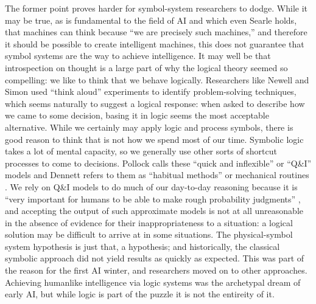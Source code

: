 The former point proves harder for symbol-system researchers to dodge.
While it may be true, as is 
fundamental to the field of AI and which even Searle holds, that
machines can think because ``we are precisely such machines,'' \cite[p.
83]{chineseSearle} and therefore it should be possible to create
intelligent machines, this does not guarantee that symbol systems are
the way to achieve intelligence. It may well be that introspection on
thought is a large part of why the logical theory seemed so
compelling:  we like to think that we behave logically. Researchers like Newell
and Simon used ``think aloud'' experiments to identify problem-solving
techniques, \cite[Ch. 10]{mccorduck} which seems naturally to suggest a
logical response:  when
asked to describe how we came to some decision, basing it in logic
seems the most acceptable alternative. While we certainly may apply logic
and process symbols, there is good reason to think that is not how we
spend most of our time. Symbolic logic takes a lot of mental capacity,
so we generally use other sorts of shortcut processes to come to
decisions. Pollock calls these ``quick and inflexible'' or ``Q\&I''
models \cite[p. 120]{pollock} and Dennett refers to them as ``habitual methods'' or
mechanical routines \cite[p. 157]{dennett}. We rely on Q\&I models to do
much of our day-to-day reasoning because it is ``very important for
humans to be able to make rough probability judgments'' \cite[p.
  120]{pollock}, and accepting the output of such approximate models
is not at all unreasonable in the absence of evidence for their
inappropriateness to a situation:  a logical solution may be difficult
to arrive at in some situations. The physical-symbol system hypothesis
is just that, a hypothesis; and historically, the classical symbolic
approach did not yield results as quickly as expected. This was part
of the reason for the first AI winter, and researchers moved on to
other approaches. Achieving humanlike intelligence via logic
systems was the archetypal dream of early AI, but while logic is
part of the puzzle it is not the entireity of it.

